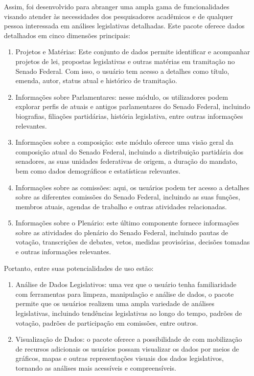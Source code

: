\documentclass{article}
\begin{document}
Assim, foi desenvolvido para abranger uma ampla gama de funcionalidades
visando atender às necessidades dos pesquisadores acadêmicos e de
qualquer pessoa interessada em análises legislativas detalhadas. Este
pacote oferece dados detalhados em cinco dimensões principais:

\begin{enumerate}
\def\labelenumi{\arabic{enumi})}
\item
  Projetos e Matérias: Este conjunto de dados permite identificar e
  acompanhar projetos de lei, propostas legislativas e outras matérias
  em tramitação no Senado Federal. Com isso, o usuário tem acesso a
  detalhes como título, emenda, autor, status atual e histórico de
  tramitação.
\item
  Informações sobre Parlamentares: nesse módulo, os utilizadores podem
  explorar perfis de atuais e antigos parlamentares do Senado Federal,
  incluindo biografias, filiações partidárias, história legislativa,
  entre outras informações relevantes.
\item
  Informações sobre a composição: este módulo oferece uma visão geral da
  composição atual do Senado Federal, incluindo a distribuição
  partidária dos senadores, as suas unidades federativas de origem, a
  duração do mandato, bem como dados demográficos e estatísticas
  relevantes.
\item
  Informações sobre as comissões: aqui, os usuários podem ter acesso a
  detalhes sobre as diferentes comissões do Senado Federal, incluindo as
  suas funções, membros atuais, agendas de trabalho e outras atividades
  relacionadas.
\item
  Informações sobre o Plenário: este último componente fornece
  informações sobre as atividades do plenário do Senado Federal,
  incluindo pautas de votação, transcrições de debates, vetos, medidas
  provisórias, decisões tomadas e outras informações relevantes.
\end{enumerate}

Portanto, entre suas potencialidades de uso estão:

\begin{enumerate}
\def\labelenumi{\arabic{enumi})}
\item
  Análise de Dados Legislativos: uma vez que o usuário tenha
  familiaridade com ferramentas para limpeza, manipulação e análise de
  dados, o pacote permite que os usuários realizem uma ampla variedade
  de análises legislativas, incluindo tendências legislativas ao longo
  do tempo, padrões de votação, padrões de participação em comissões,
  entre outros.
\item
  Visualização de Dados: o pacote oferece a possibilidade de com
  mobilização de recursos adicionais os usuários possam visualizar os
  dados por meios de gráficos, mapas e outras representações visuais dos
  dados legislativos, tornando as análises mais acessíveis e
  compreensíveis.
\end{enumerate}
\end{document}
